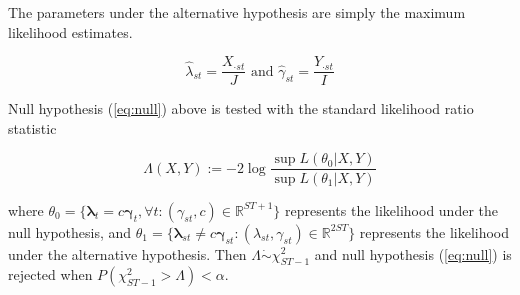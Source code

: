 The parameters under the alternative hypothesis are simply the maximum likelihood estimates.

\begin{equation*}
  \hat{\lambda}_{st} = \frac{X_{\cdot st}}{J} \text{ and } \hat{\gamma}_{st} = \frac{Y_{\cdot st}}{I}
\end{equation*}


Null hypothesis (\ref{eq:null}) above is tested with the standard likelihood ratio statistic

\begin{equation}
  \label{eq:lrt}
  \Lambda(X,Y) := -2 \log{ \frac{ \sup L(\theta_0|X,Y)}{ \sup L(\theta_1|X,Y)} }
\end{equation}

where $\theta_0 = \{ \boldsymbol{\lambda}_t = c \boldsymbol{\gamma}_t, \forall t : (\gamma_{st}, c) \in \mathbb{R}^{ST+1} \}$ represents the likelihood under the null hypothesis, and $\theta_1 = \{ \boldsymbol{\lambda}_{st} \ne c \boldsymbol{\gamma}_{st} : (\lambda_{st}, \gamma_{st}) \in \mathbb{R}^{2ST} \}$ represents the likelihood under the alternative hypothesis.  Then $\Lambda \dot{\sim} \chi^2_{ST-1}$ and null hypothesis (\ref{eq:null}) is rejected when $P(\chi^2_{ST-1} > \Lambda) < \alpha$. 